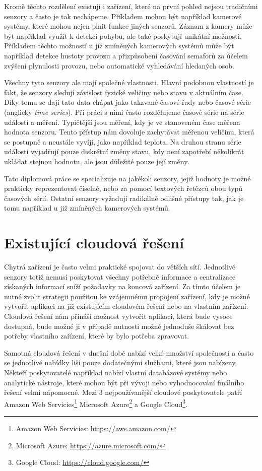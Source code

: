 Kromě těchto rozdělení existují i zařízení, které na první pohled nejsou tradičními senzory a často je tak nechápeme. Příkladem mohou být například kamerové systémy, které mohou nejen plnit funkce jiných senzorů. Záznam z kamery může být například využít k detekci pohybu, ale také poskytují unikátní možnosti. Příkladem těchto možností u již zmíněných kamerových systémů může být například detekce hustoty provozu a přizpůsobení časování semaforů za účelem zvýšení plynulosti provozu, nebo automatické vyhledávání hledaných osob.

Všechny tyto senzory ale mají společné vlastnosti. Hlavní podobnou vlastností je fakt, že senzory sledují závislost fyzické veličiny nebo stavu v aktuálním čase. Díky tomu se dají tato data chápat jako takzvané časové řady nebo časové série (anglicky \textit{time series}). Při práci s nimi často rozdělujeme časové série na série událostí a měření. Typičtější jsou měření, kdy je ve stanoveném čase měřena hodnota senzoru. Tento přístup nám dovoluje zachytávat měřenou veličinu, která se postupně a neustále vyvíjí, jako například teplota. Na druhou stranu série událostí vyjadřují pouze diskrétní změny stavu, kdy není zapotřebí několikrát ukládat stejnou hodnotu, ale jsou důležité pouze její změny.

Tato diplomová práce se specializuje na jakékoli senzory, jejiž hodnoty je možné prakticky reprezentovat číselně, nebo za pomocí textových řetězců obou typů časových sérií. Ostatní senzory vyžadují radikálně odlišné přístupy tak, jak je tomu například u již zmíněných kamerových systémů.

\section{Existující cloudová řešení} %
Chytrá zařízení je často velmi praktické spojovat do větších sítí. Jednotlivé senzory totiž nemusí poskytovat všechny potřebné informace a centralizace získaných informací sníží požadavky na koncová zařízení. Za tímto účelem je nutné zvolit strategii použitou ke vzájemnému propojení zařízení, kdy je možné vytvořit aplikaci na již existujícím cloudovém řešení nebo na vlastním zařízení. Cloudová řešení nám přináší možnost vytvořit aplikaci, která bude vysoce dostupná, bude možné ji v případě nutnosti možné jednoduše škálovat bez potřeby vlastního zařízení, které by bylo potřeba zpravovat. 

Samotná cloudová řešení v dnešní době nabízí velké množství společností a často se jednotlivé nabídky liší pouze dodatečnými službami, které jsou nabízeny. Někteří poskytovatelé například nabízí vlastní databázové systémy nebo analytické nástroje, které mohou být při vývoji nebo vyhodnocování finálního řešení velmi nápomocné. Mezi 3 nejpoužívanější \cite{gartner_2021} cloudové poskytovatele patří Amazon Web Servicies\footnote{Amazon Web Servicies: \url{https://aws.amazon.com/}} Microsoft Azure\footnote{Microsoft Azure: \url{https://azure.microsoft.com/}} a Google Cloud\footnote{Google Cloud: \url{https://cloud.google.com/}}.

